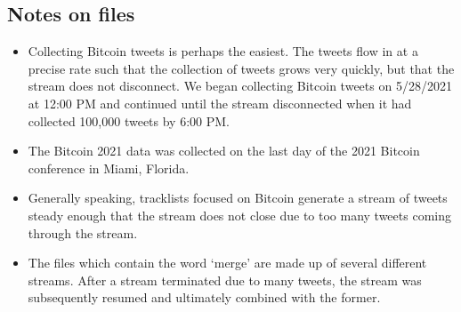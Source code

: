 \documentclass[a4paper,11pt]{article}
\begin{document}
\subsection{Notes on files}
\begin{itemize}
    \item  Collecting Bitcoin tweets is perhaps the easiest. The tweets flow in at a precise rate such that the collection of tweets grows very quickly, but that the stream does not disconnect.  We began collecting Bitcoin tweets on 5/28/2021 at 12:00 PM and continued until the stream disconnected when it had collected 100,000 tweets by 6:00 PM.
    \item  The Bitcoin 2021 data was collected on the last day of the 2021 Bitcoin conference in Miami, Florida.
    \item Generally speaking, tracklists focused on Bitcoin generate a stream of tweets steady enough that the stream does not close due to too many tweets coming through the stream.
    \item The files which contain the word `merge' are made up of several different streams. 
    After a stream terminated due to many tweets, the stream was subsequently resumed and ultimately
    combined with the former.
\end{itemize}
\end{document}

